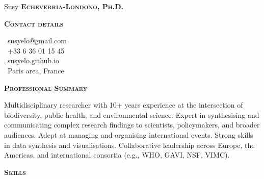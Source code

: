 \documentclass[10pt, a4paper]{article}
\newcommand{\headleft}[1]{\vspace*{3ex}\textsc{\textbf{#1}}\par%
    \vspace*{-1.5ex}\hrulefill\par\vspace*{0.7ex}}
\begin{document}
\setlength{\topskip}{0pt}
\setlength{\parindent}{0pt}
\setlength{\parskip}{0pt}
\setlength{\fboxsep}{0pt}
\pagestyle{empty}
\raggedbottom

\begin{minipage}[t]{0.33\textwidth} %
\colorbox{cvblue}{\begin{minipage}[t][5mm][t]{\textwidth}\null\hfill\null\end{minipage}}

\vspace{-.2ex} %
\colorbox{cvblue!90}{\color{white}  %
\textwidth\relax%
\begin{minipage}[t][293mm][t]{0.82\textwidth}
\raggedright
\vspace*{2.5ex}

\Large Susy \textbf{\textsc{Echeverria-Londono, Ph.D.}} \normalsize 


\headleft{Contact details}
\small %
\MVAt\ {\small susyelo@gmail.com} \\[0.4ex]
\Mobilefone\ +33 6 36 01 15 45 \\[0.5ex]
\Mundus\ \href{https://susyelo.github.io/}{susyelo.github.io} \\[0.1ex]
\Letter\ Paris area, France
\normalsize

\vspace*{0.5ex} %

\headleft{Professional Summary}
Multidisciplinary researcher with 10+ years experience at the intersection of biodiversity, public health, and environmental science. Expert in synthesising and communicating complex research findings to scientists, policymakers, and broader audiences. Adept at managing and organising international events. Strong skills in data synthesis and visualisations. Collaborative leadership across Europe, the Americas, and international consortia (e.g., WHO, GAVI, NSF, VIMC).

\headleft{Skills}
\begin{itemize}


\end{itemize}
\end{minipage}}
\end{minipage}
\end{document}
